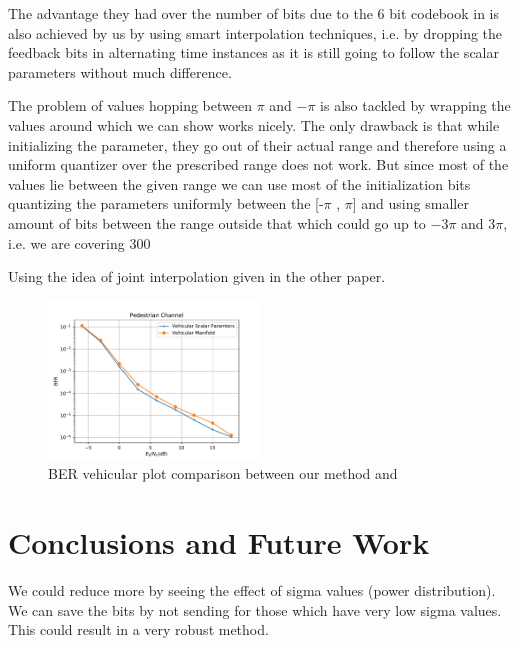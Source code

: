 \documentclass[conference]{IEEEtran}
\begin{document}
The advantage they had over the number of bits due to the 6 bit codebook in \cite{6891198,Gupt1905:Predictive} is also achieved by us by using smart interpolation techniques, i.e. by dropping the feedback bits in alternating time instances as it is still going to follow the scalar parameters without much difference.

The problem of values hopping between $\pi$ and $-\pi$ is also tackled by wrapping the values around which we can show works nicely. The only drawback is that while initializing the parameter, they go out of their actual range and therefore using a uniform quantizer over the prescribed range does not work. But since most of the values lie between the given range we can use most of the initialization bits quantizing the parameters uniformly between the [-$\pi$ , $\pi$] and using smaller amount of bits between the range outside that which could go up to $-3\pi$ and $3\pi$, i.e. we are covering 300%

Using the idea of joint interpolation given in the other paper.

\begin{figure}
\includegraphics[width=0.5\textwidth]{images/vehicular_ber.pdf}
\caption{BER vehicular plot comparison between our method and \cite{Gupt1905:Predictive}}
\label{ber_overview}
\vspace{-5pt}
\end{figure}
\section{Conclusions and Future Work}
\label{section4}

We could reduce more by seeing the effect of sigma values (power distribution). We can save the bits by not sending for those which have very low sigma values. This could result in a very robust method.
\end{document}
